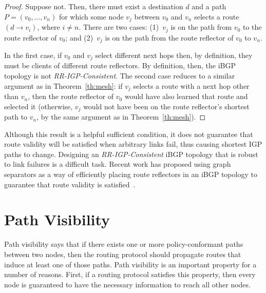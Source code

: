 \begin{proof}
Suppose not.  Then, there must exist a
destination $d$ and a path $P = (v_0, \ldots, v_n)$ for which some node $v_j$
between $v_0$ and $v_n$ selects a route $(d \rightarrow v_i)$, where $i
\neq n$.  There are two cases: (1)~$v_j$ is on the path from $v_0$ to the
route reflector of $v_0$; and (2)~$v_j$ is on the path from the route
reflector of $v_0$ to $v_n$.  

In the first case, if $v_0$ and $v_j$ select different next hops then, by
definition, they must be clients of different route reflectors.
By definition, then, the iBGP topology is not {\em RR-IGP-Consistent}.
The second case reduces to a similar argument as in
Theorem~\ref{th:mesh}: if $v_j$ selects a route with a next hop other
than $v_n$, then the route reflector of $v_0$ would have also learned that
route and selected it (otherwise, $v_j$ would not have been on the route
reflector's shortest path to $v_n$, by the same argument as in
Theorem~\ref{th:mesh}).
\end{proof}

Although this result is a helpful sufficient condition, it does not
guarantee that route validity will be satisfied when arbitrary links
fail, thus causing shortest IGP paths to change.  Designing an {\em
RR-IGP-Consistent} iBGP topology that is robust to link failures is a
difficult task.  Recent work has proposed using graph separators as a
way of efficiently placing route reflectors in an iBGP topology 
to guarantee that route validity is satisfied~\cite{Vutukuru2005}.  



\section{Path Visibility}\label{sec:visibility_def}

Path visibility says that if there exists one or more policy-conformant
paths between two 
nodes, then the routing protocol should propagate routes that 
induce at least one of those paths.  Path visibility is an important
property for a number of reasons.  First, if a routing protocol
satisfies this property, then every node is guaranteed to have the
necessary information to reach all other nodes.

